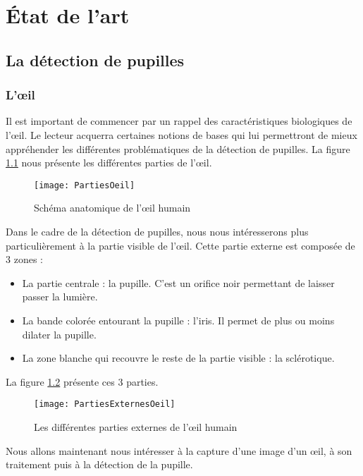 \chapter{État de l'art}

\section{La détection de pupilles}

\subsection{L’œil}

Il est important de commencer par un rappel des caractéristiques biologiques de l’œil. Le lecteur acquerra certaines notions de bases qui lui permettront de mieux appréhender les différentes problématiques de la détection de pupilles.
La figure \ref{fig:PartiesOeil} nous présente les différentes parties de l’œil.

\begin{figure}[H]
  \centering
  \texttt{[image: PartiesOeil]}
  \caption{Schéma anatomique de l'œil humain}
  \label{fig:PartiesOeil}
\end{figure}

Dans le cadre de la détection de pupilles, nous nous intéresserons plus particulièrement à la partie visible de l’œil. Cette partie externe est composée de 3 zones :
\begin{itemize}[label=\textbullet,font=\color{black}]
\item La partie centrale : la pupille. C’est un orifice noir permettant de laisser passer la lumière.
\item La bande colorée entourant la pupille : l’iris. Il permet de plus ou moins dilater la pupille.
\item La zone blanche qui recouvre le reste de la partie visible : la sclérotique.
\end{itemize}

La figure \ref{fig:PartiesExternesOeil} présente ces 3 parties.
\begin{figure}[h]
  \centering
  \texttt{[image: PartiesExternesOeil]}
  \caption{Les différentes parties externes de l'œil humain}
  \label{fig:PartiesExternesOeil}
\end{figure}

Nous allons maintenant nous intéresser à la capture d’une image d’un œil, à son traitement puis à la détection de la pupille.

